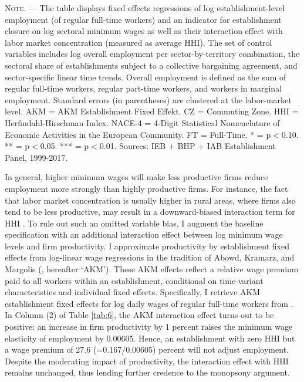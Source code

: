 \documentclass[11pt,oneside,reqno,xcolor=dvipsnames]{article} %
\begin{document}
\begin{table}[!ht]
{\begin{threeparttable}
\begin{tablenotes}
\item \footnotesize \textsc{Note. ---} The table displays fixed effects regressions of log establishment-level employment (of regular full-time workers) and an indicator for establishment closure on log sectoral minimum wages as well as their interaction effect with labor market concentration (measured as average HHI). The set of control variables includes log overall employment per sector-by-territory combination, the sectoral share of establishments subject to a collective bargaining agreement, and sector-specific linear time trends. Overall employment is defined as the sum of regular full-time workers, regular part-time workers, and workers in marginal employment. Standard errors (in parentheses) are clustered at the labor-market level. AKM = AKM Establishment Fixed Effekt. CZ = Commuting Zone. HHI = Herfindahl-Hirschman Index. NACE-4 = 4-Digit Statistical Nomenclature of Economic Activities in the European Community. FT = Full-Time. * = p$<$0.10. ** = p$<$0.05. *** = p$<$0.01. Sources: IEB $\plus$ BHP $\plus$ IAB Establishment Panel, 1999-2017.
\end{tablenotes}
\end{threeparttable}
}
\end{table}

In general, higher minimum wages will make less productive firms reduce employment more strongly than highly productive firms. For instance, the fact that labor market concentration is usually higher in rural areas, where firms also tend to be less productive, may result in a downward-biased interaction term for HHI \citep{AzarEtAl2019a}. To rule out such an omitted variable bias, I augment the baseline specification with an additional interaction effect between log minimum wage levels and firm productivity. I approximate productivity by establishment fixed effects from log-linear wage regressions in the tradition of Abowd, Kramarz, and Margolis (\citeyear{AbowdEtAl1999}, hereafter `AKM'). These AKM effects reflect a relative wage premium paid to all workers within an establishment, conditional on time-variant characteristics and individual fixed effects. Specifically, I retrieve AKM establishment fixed effects for log daily wages of regular full-time workers from \citet{BellmannEtAl2020}. In Column (2) of Table \ref{tab:6}, the AKM interaction effect turns out to be positive: an increase in firm productivity by 1 percent raises the minimum wage elasticity of employment by 0.00605. Hence, an establishment with zero HHI but a wage premium of 27.6 (=0.167/0.00605) percent will not adjust employment. Despite the moderating impact of productivity, the interaction effect with HHI remains unchanged, thus lending further credence to the monopsony argument.
\end{document}
